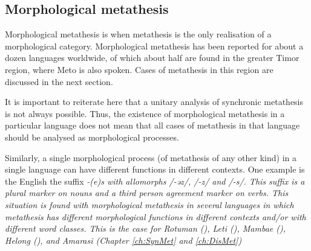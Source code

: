 \subsection{Morphological metathesis}\label{sec:MorMet}
Morphological metathesis is when metathesis is the
only realisation of a morphological category.
Morphological metathesis has been reported
for about a dozen languages worldwide, of which about half
are found in the greater Timor region, where Meto is also spoken.
Cases of metathesis in this region are discussed in the next section.

It is important to reiterate here that a unitary analysis of synchronic
metathesis is not always possible.
Thus, the existence of morphological metathesis in a particular
language does not mean that all cases of metathesis in that
language should be analysed as morphological processes.

Similarly, a single morphological process (of metathesis of any other kind)
in a single language can have different functions in different contexts.
One example is the English the suffix \it{-(e)s} with allomorphs /-əz/, /-z/ and /-s/.
This suffix is a plural marker on nouns and a third person agreement marker on verbs.
This situation is found with morphological metathesis in several languages
in which metathesis has different morphological functions in different contexts
and/or with different word classes.
This is the case for Rotuman (), Leti (),
Mambae (), Helong (), and Amarasi
(Chapter \ref{ch:SynMet} and \ref{ch:DisMet})